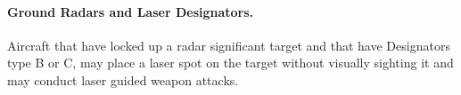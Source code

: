 \begin{advancedrules}
\paragraph{Ground Radars and Laser Designators.} Aircraft that have locked up a radar significant target and that have Designators type B or C, may place a laser spot on the target without visually sighting it and may conduct laser guided weapon attacks.


\end{advancedrules}
